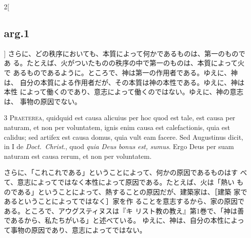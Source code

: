 \documentclass[paper=a4paper,fontsize=10pt,jafontsize=9pt,titlepage]{jlreq}
\begin{document}
\begin{paracol}{2}[\subsection{arg.1}]
さらに、どの秩序においても、本質によって何かであるものは、第一のものであ
 る。たとえば、火がついたものの秩序の中で第一のものは、本質によって火で
 あるものであるように。ところで、神は第一の作用者である。ゆえに、神は、
 自分の本質による作用者だが、その本質は神の本性である。ゆえに、神は本性
 によって働くのであり、意志によって働くのではない。ゆえに、神の意志は、
 事物の原因でない。



{\scshape 3 Praeterea}, quidquid est causa alicuius per
 hoc quod est tale, est causa per naturam, et non per voluntatem, ignis
 enim causa est calefactionis, quia est calidus; sed artifex est causa
 domus, quia vult eam facere. Sed Augustinus dicit, in I de
 {\itshape Doct.~Christ}., quod {\itshape quia Deus bonus est, sumus}. Ergo Deus per suam
 naturam est causa rerum, et non per voluntatem.

\switchcolumn

さらに、「これこれである」ということによって、何かの原因であるものはす
 べて、意志によってではなく本性によって原因である。たとえば、火は「熱い
 ものである」ということによって、熱することの原因だが、建築家は、［建築
 家であるということによってではなく］家を作
 ることを意志するから、家の原因である。ところで、アウグスティヌスは『キ
 リスト教の教え』第1巻で、「神は善であるから、私たちがいる」と述べている。
 ゆえに、神は、自分の本性によって事物の原因であり、意志によってではない。




\end{paracol}
\end{document}
